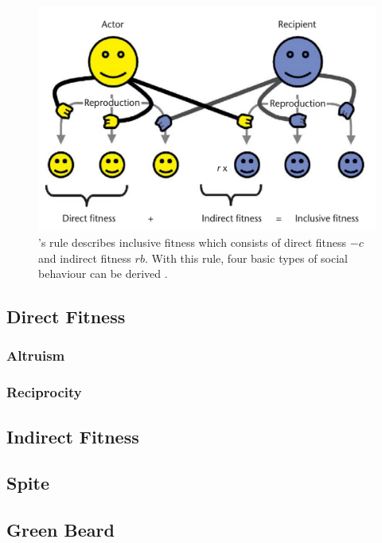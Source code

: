 \documentclass[sigconf]{acmart}
\begin{document}
    \begin{figure}
        \includegraphics[width=\columnwidth]{figures/hamiltons_rule}
        \caption{\citeauthor{hamilton_kin_1964}'s rule describes inclusive fitness which consists of direct fitness $-c$ and indirect fitness $rb$. With this rule, four basic types of social behaviour can be derived \cite{gardner_theory_2009}.}
        \label{fig:hamilton}
    \end{figure}

    \subsection{Direct Fitness}\label{direct_fit}

    \subsubsection{Altruism}

    \subsubsection{Reciprocity}

    \subsection{Indirect Fitness}\label{indirect_fit}

    \subsection{Spite}

    \subsection{Green Beard}\cite{west_altruism_2010}\cite{bala_green_2017}
\end{document}
